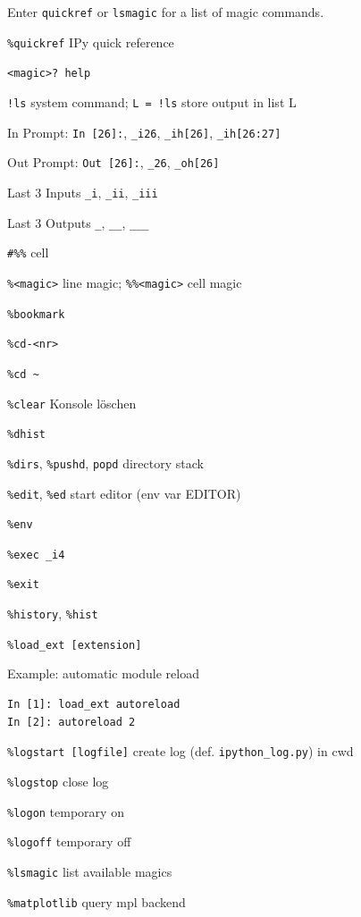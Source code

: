 \documentclass[9pt,a4wide]{extarticle}
\begin{document}
\setlength{\columnsep}{1cm}
\begin{multicols}{3}

Enter {\tt quickref} or {\tt lsmagic} for a list of magic commands.


{\tt \%quickref} \rval IPy quick reference

{\tt <magic>? \rval help}

{\tt !ls} \rval system command; {\tt L = !ls} store output in list L

In Prompt: {\tt In [26]:}, {\tt \_i26}, {\tt \_ih[26]}, {\tt \_ih[26:27]}

Out Prompt: {\tt Out [26]:}, {\tt \_26}, {\tt \_oh[26]} 

Last 3 Inputs {\tt \_i}, {\tt \_ii}, {\tt \_iii}

Last 3 Outputs {\tt \_}, {\tt \_\_}, {\tt \_\_\_} 

{\tt \#\%\%} \rval cell

{\tt \%<magic>} \rval line magic; {\tt \%\%<magic>} \rval cell magic

{\tt \%bookmark}

{\tt \%cd-<nr>}

{\tt \%cd \~{}}

{\tt \%clear} \rval Konsole löschen

{\tt \%dhist}

{\tt \%dirs}, {\tt \%pushd}, {\tt popd} \rval directory stack

{\tt \%edit}, {\tt \%ed} start editor (env var EDITOR)

{\tt \%env}

{\tt \%exec \_i4}

{\tt \%exit}

{\tt \%history}, {\tt \%hist}

{\tt \%load\_ext [extension]}

Example: automatic module reload

\begin{verbatim}
In [1]: load_ext autoreload
In [2]: autoreload 2
\end{verbatim}

{\tt \%logstart [logfile]} create log (def. {\tt ipython\_log.py}) in cwd

{\tt \%logstop} close log

{\tt \%logon} temporary on

{\tt \%logoff} temporary off

{\tt \%lsmagic} \rval list available magics

{\tt \%matplotlib} query mpl backend


\end{multicols}
\end{document}
